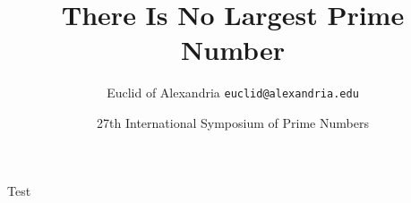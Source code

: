 \documentclass[aspectratio=169]{beamer}
\title{There Is No Largest Prime Number}
\date[ISPN ’80]{27th International Symposium of Prime Numbers}
\author[Euclid]{Euclid of Alexandria \texttt{euclid@alexandria.edu}}
\begin{document}
\begin{frame}
\titlepage
\end{frame}

\begin{frame}
  Test
\end{frame}
\end{document}
